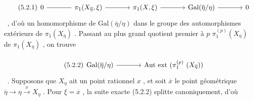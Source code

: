 \begin{equation}\tag{5.2.1}
\begin{tikzcd}[column sep=large, row sep=tiny]
0 \arrow[r, dash] & \pi_1(X_{\overline{\eta}},\xi) \arrow[r] & \pi_1(X,\xi) \arrow[r] & \mathrm{Gal}(\overline{\eta}/\eta) \arrow[r] & 0
\end{tikzcd}
\end{equation}\ ,
d'où un homomorphisme de  $\mathrm{Gal}(\overline{\eta}/\eta)$  dans le groupe des automorphismes extérieurs de $\pi_1(X_{\overline{\eta}})$ . Passant au plus grand quotient premier à  $p$  $\pi_1^{(p)}(X_{\overline{\eta}})$  de  $\pi_1(X_{\overline{\eta}})$ , on trouve

\begin{equation}\tag{5.2.2}
\begin{tikzcd}[column sep=large, row sep=tiny]
\mathrm{Gal}(\overline{\eta}/\eta) \arrow[r] & \mathrm{Aut}\ \mathrm{ext}\ (\pi_1^{(p)}\ (X_{\overline{\eta}}))
\end{tikzcd}
\end{equation}\ .
Supposons que  $X_\eta$  ait un point rationnel  $x$ , et soit  $\overline{x}$  le point géométrique  $\overline{\eta} \longrightarrow \eta \xrightarrow{\ x\ } X_\eta$ . Pour  $\xi = \overline{x}$ , la suite exacte (5.2.2) splitte canoniquement, d'où


